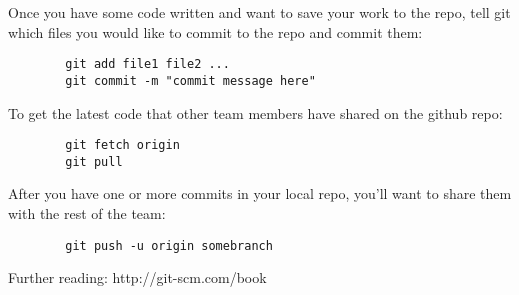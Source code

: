 \documentclass{article}
\begin{document}
	Once you have some code written and want to save your work to the repo, tell git which files you would like to commit to the repo and commit them:
	
	\begin{minipage}{0.95\textwidth}\begin{lstlisting}
	    git add file1 file2 ...
	    git commit -m "commit message here"
	\end{lstlisting}\end{minipage}

	To get the latest code that other team members have shared on the github repo:

	\begin{minipage}{0.95\textwidth}\begin{lstlisting}
	    git fetch origin
	    git pull
	\end{lstlisting}\end{minipage}

	After you have one or more commits in your local repo, you'll want to share them with the rest of the team:

	\begin{minipage}{0.95\textwidth}\begin{lstlisting}
	    git push -u origin somebranch
	\end{lstlisting}\end{minipage}

	Further reading: http://git-scm.com/book
\end{document}
